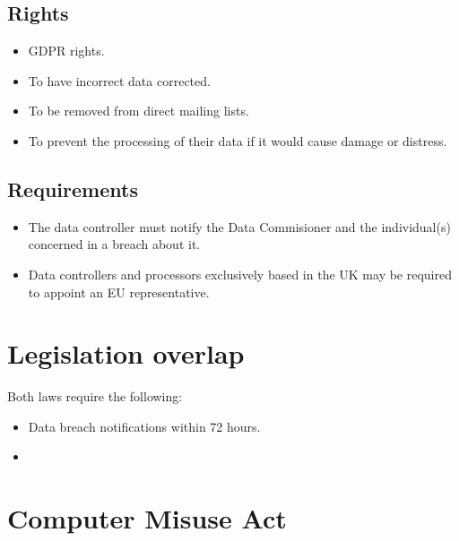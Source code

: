 \documentclass[12pt]{report}
\begin{document}
\subsection{Rights}
\begin{itemize}
	\item GDPR rights.
	\item To have incorrect data corrected.
	\item To be removed from direct mailing lists.
	\item To prevent the processing of their data if it would cause damage or distress.
\end{itemize}

\subsection{Requirements}
\begin{itemize}
	\item The data controller must notify the Data Commisioner and the individual(s) concerned in a breach about it.
	\item Data controllers and processors exclusively based in the UK may be required to appoint an EU representative.
\end{itemize}

\section{Legislation overlap}
Both laws require the following:
\begin{itemize}
	\item Data breach notifications within 72 hours.
	\item 
\end{itemize}

\pagebreak

\section{Computer Misuse Act}
\end{document}
